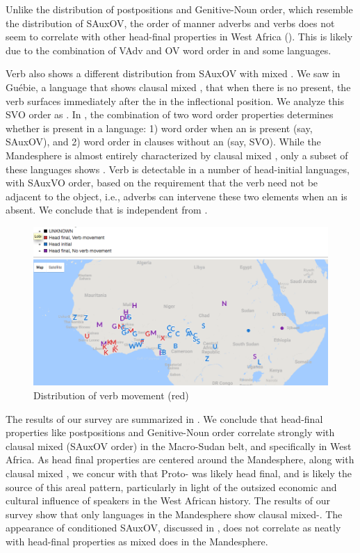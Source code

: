 \documentclass[output=paper,newtxmath,modfonts,nonflat,draftmode]{langsci/langscibook}
\begin{document}
Unlike the distribution of postpositions and Genitive-Noun order, which resemble the distribution of SAuxOV, the order of manner adverbs and verbs does not seem to correlate with other head-final properties in West Africa (). This is likely due to the combination of VAdv and OV word order in  and some  languages.

Verb  also shows a different distribution from SAuxOV with mixed . We saw in Guébie, a language that shows clausal mixed , that when there is no  present, the verb surfaces immediately after the  in the inflectional position. We analyze this SVO order as . In , the combination of two word order properties determines whether  is present in a language: 1) word order when an  is present (say, SAuxOV), and 2) word order in clauses without an  (say, SVO). While the Mandesphere is almost entirely characterized by clausal mixed , only a subset of these languages shows . Verb  is detectable in a number of head-initial languages, with SAuxVO order, based on the requirement that the verb need not be adjacent to the object, i.e., adverbs can intervene these two elements when an  is absent. We conclude that  is independent from .

\begin{figure}
   \centering
    \includegraphics[width = .7\textwidth]{figures/VMove}
    \caption{Distribution of verb movement (red)}\label{fig:sande:vmove}
\end{figure}

The results of our survey are summarized in . We conclude that head-final properties like postpositions and Genitive-Noun order correlate strongly with clausal mixed  (SAuxOV  order) in the Macro-Sudan belt, and specifically in West Africa. As head final properties are centered around the Mandesphere, along with clausal mixed , we concur with \citet{heine76} that Proto- was likely head final, and is likely the source of this areal pattern, particularly in light of the outsized economic and cultural influence of  speakers in the West African history. The results of our survey show that only languages in the Mandesphere show clausal mixed-. The appearance of conditioned SAuxOV, discussed in  , does not correlate as neatly with head-final properties as mixed  does in the Mandesphere.
\end{document}
